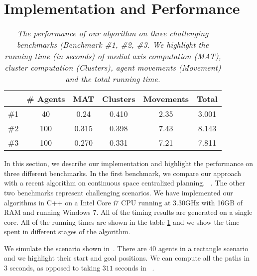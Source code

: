 \section{Implementation and Performance}
\begin{table}[t]
\centering{}%
\begin{tabular}{|c|c|c|c|c|c|}
\hline

\multicolumn{1}{|c|}{} & \# Agents & MAT  & Clusters  & Movements & Total  \\ \hline
 \#1 &40& 0.24 & 0.410  &2.35 &  3.001 \tabularnewline
 \#2 &100& 0.315  &0.398& 7.43 & 8.143\tabularnewline
 \#3 &100& 0.270 &0.331& 7.21 &  7.811\tabularnewline
\hline
\end{tabular}
\caption{\em The performance of our algorithm on three challenging benchmarks (Benchmark \#1, \#2, \#3. We highlight the running time (in seconds) of medial axis computation (MAT), cluster computation (Clusters), agent movements (Movement) and the total running time.}
\vspace{-0.5cm}
\label{tab:benchmark}
\end{table}
In this section, we describe our implementation and highlight the
performance on three different benchmarks. In the first benchmark, we compare
our approach with a recent algorithm on continuous space centralized planning.
~\cite{DBLP:journals/corr/SoloveyYZH15}. The other two benchmarks represent challenging scenarios.
We have implemented our algorithms in C++
on a Intel Core i7 CPU running at 3.30GHz with 16GB of RAM
and running Windows 7. All of the timing results are generated on
a single core.
All of the running times are shown in the table \ref{tab:benchmark} and we show the time spent in different stages of the algorithm.

 We simulate the scenario shown in~\cite{DBLP:journals/corr/SoloveyYZH15}.
There are $40$ agents in a rectangle scenario and we highlight their start and goal positions. We can compute all the paths in $3$ seconds, as opposed to taking  $311$  seconds in ~\cite{DBLP:journals/corr/SoloveyYZH15}.

